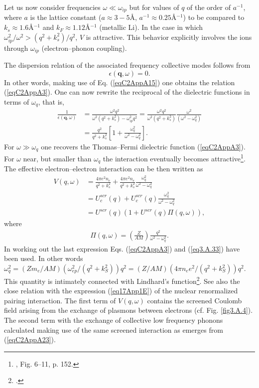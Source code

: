 Let us now consider frequencies $\omega\ll \omega_{ip}$ but for values of $q$ of the order of $a^{-1}$, where $a$ is the lattice constant ($a\approx 3-5$\AA, $a^{-1}\approx 0.25$\AA$^{-1}$) to be compared to $k_s\approx 1.6 $\AA$^{-1}$ and $k_F\approx 1.12$\AA$^{-1}$ (metallic Li). In the case in which $\omega_{ip}^2/\omega^2>(q^2+k_s^2)/q^2$, $V$ is attractive.  This behavior explicitly involves the ions through $\omega_{ip}$ (electron--phonon coupling). 


The dispersion relation of the associated frequency collective modes follows from
\begin{equation}\label{eqC2AppA21}
\epsilon(\mathbf q,\omega)=0.
\end{equation}
In other words, making use of Eq. (\ref{eqC2AppA15}) one obtains the relation (\ref{eqC2AppA3}). One can now rewrite the reciprocal of the dielectric functions in terms of $\omega_{q}$, that is,
\begin{align}\label{eqC2AppA22}
\nonumber \frac{1}{\epsilon(\mathbf q,\omega)}&=\frac{\omega^2q^2}{\omega^2(q^2+k_s^2)-\omega_{ip}^2q^2}=\frac{\omega^2q^2}{\omega^2(q^2+k_s^2)}\frac{\omega^2}{(\omega^2-\omega_q^2)}\\
&=\frac{q^2}{q^2+k_s^2}\left[1+\frac{\omega_q^2}{\omega^2-\omega_q^2}\right].
\end{align}
For $\omega\gg \omega_q$ one recovers the Thomas--Fermi dielectric function (\ref{eqC2AppA3}). For $\omega$ near, but smaller than $\omega_q$ the interaction eventually becomes   attractive\footnote{\cite{Schrieffer:64}, Fig. 6--11, p. 152.}. The effective electron--electron interaction can be then written as
\begin{align}\label{eqC2AppA23}
\nonumber V(q,\omega)&=\frac{4\pi  e^2n_e}{q^2+k_s^2}+\frac{4\pi  e^2n_e}{q^2+k_s^2}\frac{\omega_q^2}{\omega^2-\omega_q^2}\\
\nonumber &=U^{scr}_c(q)+U_c^{scr}(q)\frac{\omega_q^2}{\omega^2-\omega_q^2}\\
&=U^{scr}(q)\left(1+U^{scr}(q)\Pi(q,\omega)\right),
\end{align}
where
\begin{align}\label{eqC2AppA24}
\Pi(q,\omega)=\left(\frac{Z}{AM}\right)\frac{q^2}{\omega^2-\omega_q^2}.
\end{align}
In working out the last expression Eqs. (\ref{eqC2AppA3}) and (\ref{eq3.A.33}) have been used. In other words $\omega_q^2=(Zm_e/AM)(\omega^2_{ep}/(q^2+k_S^2))q^2=(Z/AM)(4\pi n_ee^2/(q^2+k_S^2))q^2$.
This quantity
is intimately connected with Lindhard's function\footnote{\cite{Lindhard:53}.}. See also the close relation with the expression (\ref{eq17App1E}) of the nuclear renormalized pairing interaction. The first term of $V(q,\omega)$ contains the screened Coulomb field arising from the exchange of plasmons between electrons (cf. Fig. \ref{fig3.A.4}). The second term with the exchange of collective low frequency phonons calculated making use of the same screened interaction as emerges from (\ref{eqC2AppA23}). 


